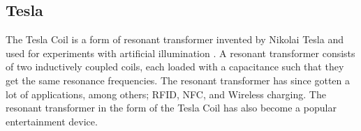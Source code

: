 \subsection{Tesla}
\label{tesla}
The Tesla Coil is a form of resonant transformer invented by Nikolai Tesla and used for experiments with artificial illumination \citep{5570149}. A resonant transformer consists of two inductively coupled coils, each loaded with a capacitance such that they get the same resonance frequencies. The resonant transformer has since gotten a lot of applications, among others; RFID, NFC, and Wireless charging. The resonant transformer in the form of the Tesla Coil has also become a popular entertainment device.

